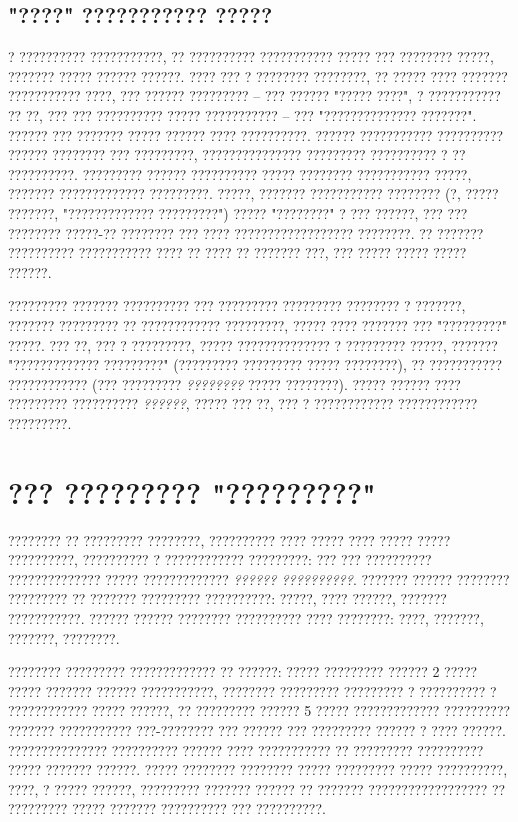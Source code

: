 \subsection{"????" ??????????? ?????}

? ?????????? ???????????, ?? ?????????? ??????????? ????? ??? ???????? ?????, ??????? ????? ?????? ??????.  ???? ??? ? ???????? ????????, ?? ????? ???? ??????? ??????????? ????, ??? ?????? ????????? -- ??? ?????? "????? ????", ? ??????????? ?? ??, ??? ??? ?????????? ????? ??????????? -- ??? "?????????????? ???????".  ?????? ??? ??????? ????? ?????? ???? ??????????.  ?????? ??????????? ?????????? ?????? ???????? ??? ?????????, ??????????????? ????????? ?????????? ? ?? ??????????.  ????????? ?????? ?????????? ????? ???????? ??????????? ?????, ??????? ????????????? ?????????.  ?????, ??????? ??????????? ???????? (?, ????? ???????, "????????????? ?????????") ????? "????????" ? ??? ??????, ??? ??? ???????? ?????-?? ???????? ??? ???? ?????????????????? ????????.  ?? ??????? ?????????? ??????????? ???? ?? ???? ?? ??????? ???, ??? ????? ????? ????? ??????.

????????? ??????? ?????????? ??? ????????? ????????? ???????? ? ???????, ??????? ????????? ?? ???????????? ?????????, ????? ???? ??????? ??? "?????????" ?????.  ??? ??, ??? ? ?????????, ????? ?????????????? ? ????????? ?????, ??????? "????????????? ?????????" (????????? ????????? ????? ????????), ?? ??????????? ???????????? (??? ????????? \emph{????????} ????? ????????).  ????? ?????? ???? ????????? ?????????? \emph{??????}, ????? ??? ??, ??? ? ???????????? ???????????? ?????????.

\section{??? ????????? "?????????"}

???????? ?? ????????? ????????, ?????????? ???? ????? ???? ????? ????? ??????????, ?????????? ? ???????????? ?????????: ??? ??? ?????????? ?????????????? ????? ????????????? \emph{?????? ??????????}.  ??????? ?????? ???????? ????????? ?? ??????? ????????? ??????????: ?????, ???? ??????, ??????? ???????????.  ?????? ?????? ???????? ?????????? ???? ????????: ????, ???????, ???????, ????????.

???????? ????????? ????????????? ?? ??????: ????? ????????? ?????? 2 ????? ????? ??????? ?????? ???????????, ???????? ????????? ????????? ? ?????????? ? ???????????? ????? ??????, ?? ????????? ?????? 5 ????? ????????????? ?????????? ??????? ??????????? ???-???????? ??? ?????? ??? ????????? ?????? ? ???? ??????.  ??????????????? ?????????? ?????? ???? ??????????? ?? ????????? ?????????? ????? ??????? ??????.  ????? ???????? ???????? ????? ????????? ????? ??????????, ????, ? ????? ??????, ????????? ??????? ?????? ?? ??????? ?????????????????? ?? ????????? ????? ??????? ?????????? ??? ??????????.

